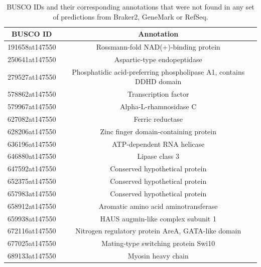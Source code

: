 \begin{table}[h]
  \centering
  \begin{tabular}{|c|c|}
    \hline
    BUSCO ID & Annotation \\ \hline
    191658at147550 & Rossmann-fold NAD(+)-binding protein \\ \hline
    250641at147550 & Aspartic-type endopeptidase \\ \hline
    279527at147550 & Phosphatidic acid-preferring phospholipase A1, contains DDHD domain \\ \hline
    578862at147550 & Transcription factor \\ \hline
    579967at147550 & Alpha-L-rhamnosidase C \\ \hline
    627082at147550 & Ferric reductase \\ \hline
    628206at147550 & Zinc finger domain-containing protein \\ \hline
    636196at147550 & ATP-dependent RNA helicase \\ \hline
    646880at147550 & Lipase class 3 \\ \hline
    647592at147550 & Conserved hypothetical protein \\ \hline
    652375at147550 & Conserved hypothetical protein \\ \hline
    657983at147550 & Conserved hypothetical protein \\ \hline
    658912at147550 & Aromatic amino acid aminotransferase \\ \hline
    659938at147550 & HAUS augmin-like complex subunit 1 \\ \hline
    672116at147550 & Nitrogen regulatory protein AreA, GATA-like domain \\ \hline
    677025at147550 & Mating-type switching protein Swi10 \\ \hline
    689133at147550 & Myosin heavy chain \\ \hline
  \end{tabular}
  \caption[Missing BUSCO IDs]{BUSCO IDs and their corresponding annotations that were not found in any set of predictions from Braker2, GeneMark or RefSeq.}
  \label{table:missed-busco-all}
\end{table}

